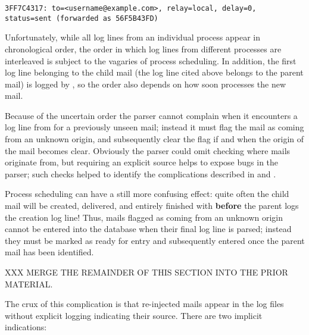 \texttt{3FF7C4317: to=<username@example.com>, relay=local, \newline{}
\tab{} delay=0, status=sent (forwarded as 56F5B43FD)}

Unfortunately, while all log lines from an individual process appear in
chronological order, the order in which log lines from different processes
are interleaved is subject to the vagaries of process scheduling.  In
addition, the first log line belonging to the child mail (the log line
cited above belongs to the parent mail) is logged by , so the
order also depends on how soon  processes the new mail.

Because of the uncertain order the parser cannot complain when it
encounters a log line from  for a previously unseen mail;
instead it must flag the mail as coming from an unknown origin, and
subsequently clear the flag if and when the origin of the mail becomes
clear.  Obviously the parser could omit checking where mails originate
from, but requiring an explicit source helps to expose bugs in the parser;
such checks helped to identify the complications described in
 and .

Process scheduling can have a still more confusing effect: quite often the
child mail will be created, delivered, and entirely finished with
\textbf{before} the parent logs the creation log line!  Thus, mails flagged
as coming from an unknown origin cannot be entered into the database when
their final log line is parsed; instead they must be marked as ready for
entry and subsequently entered once the parent mail has been identified.

XXX MERGE THE REMAINDER OF THIS SECTION INTO THE PRIOR MATERIAL\@.

The crux of this complication is that re-injected mails appear in the log
files without explicit logging indicating their source.  There are two
implicit indications:

